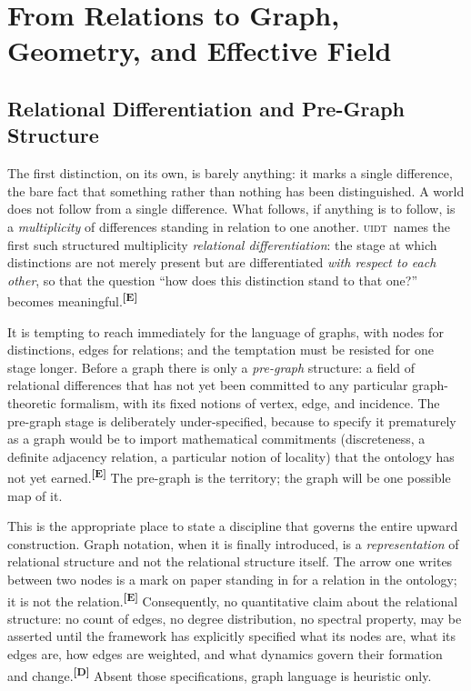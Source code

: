\documentclass[12pt,a4paper,twoside]{article}
\theoremstyle{plain}
\theoremstyle{definition}
\theoremstyle{remark}
\newcommand{\UIDT}{\textsc{uidt}}
\newcommand{\catmark}[1]{\textsuperscript{\textsf{\textbf{[#1]}}}}
\begin{document}
\section{From Relations to Graph, Geometry, and Effective Field}
\label{sec:relations-to-field}

\subsection{Relational Differentiation and Pre-Graph Structure}
\label{subsec:relational-differentiation}

The first distinction, on its own, is barely anything: it marks a single difference, the bare fact that something rather than nothing has been distinguished. A world does not follow from a single difference. What follows, if anything is to follow, is a \emph{multiplicity} of differences standing in relation to one another. \UIDT\ names the first such structured multiplicity \emph{relational differentiation}: the stage at which distinctions are not merely present but are differentiated \emph{with respect to each other}, so that the question ``how does this distinction stand to that one?'' becomes meaningful.\catmark{E}

It is tempting to reach immediately for the language of graphs, with nodes for distinctions, edges for relations; and the temptation must be resisted for one stage longer. Before a graph there is only a \emph{pre-graph} structure: a field of relational differences that has not yet been committed to any particular graph-theoretic formalism, with its fixed notions of vertex, edge, and incidence. The pre-graph stage is deliberately under-specified, because to specify it prematurely as a graph would be to import mathematical commitments (discreteness, a definite adjacency relation, a particular notion of locality) that the ontology has not yet earned.\catmark{E} The pre-graph is the territory; the graph will be one possible map of it.

This is the appropriate place to state a discipline that governs the entire upward construction. Graph notation, when it is finally introduced, is a \emph{representation} of relational structure and not the relational structure itself. The arrow one writes between two nodes is a mark on paper standing in for a relation in the ontology; it is not the relation.\catmark{E} Consequently, no quantitative claim about the relational structure: no count of edges, no degree distribution, no spectral property, may be asserted until the framework has explicitly specified what its nodes are, what its edges are, how edges are weighted, and what dynamics govern their formation and change.\catmark{D} Absent those specifications, graph language is heuristic only.
\end{document}
